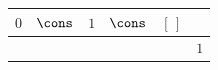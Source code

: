 {\scriptsize\setlength{\tabcolsep}{1.5pt}%
\begin{tabular}{ccccc|l}
$\text{0}$ & $\cons$ & $\text{1}$ & $\cons$ & $[\,]$ & \\ \hline
\gcell{$\posD{\bullet}$} & \gcell{$\posC{\circ}$} & \gcell{$\posD{\bullet}$} & \gcell{$\posC{\circ}$} & \gcell{$\posC{\circ}$} & $\text{1}$ \\
\end{tabular}}
